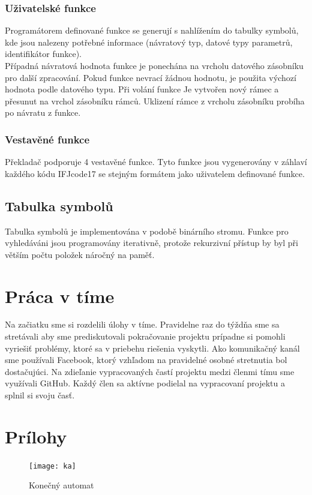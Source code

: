 \documentclass[11pt, a4paper]{article}
\begin{document}
    \subsubsection{Uživatelské funkce}
    Programátorem definované funkce se generují s nahlížením do tabulky symbolů, kde jsou nalezeny potřebné informace (návratový typ, datové typy parametrů, identifikátor funkce).\\
    \indent Případná návratová hodnota funkce je ponechána na vrcholu datového zásobníku pro další zpracování. Pokud funkce nevrací žádnou hodnotu, je použita výchozí hodnota podle datového typu.
    \indent Při volání funkce Je vytvořen nový rámec a přesunut na vrchol zásobníku rámců. Uklizení rámce z vrcholu zásobníku probíha po návratu z funkce.
        \subsubsection{Vestavěné funkce}
    Překladač podporuje 4 vestavěné funkce. Tyto funkce jsou vygenerovány v záhlaví každého kódu IFJcode17 se stejným formátem jako uživatelem definované funkce.
\subsection{Tabulka symbolů}
    Tabulka symbolů je implementována v podobě binárního stromu. Funkce pro vyhledáváni jsou programovány iterativně, protože rekurzivní přístup by byl při větším počtu položek náročný na paměť.
\section {Práca v tíme}
Na začiatku sme si rozdelili úlohy v tíme. Pravidelne raz do týždňa sme sa stretávali aby sme prediskutovali pokračovanie projektu prípadne si pomohli vyriešiť problémy, ktoré sa v priebehu riešenia vyskytli. Ako komunikačný kanál sme používali  Facebook, ktorý vzhľadom na pravidelné osobné stretnutia bol dostačujúci. Na zdieľanie vypracovaných častí projektu medzi členmi tímu sme využívali GitHub.  Každý člen sa aktívne podielal na vypracovaní projektu a splnil si svoju časť.
\newpage
\section{Prílohy} 

 \begin{figure} [h]
	\begin{center}
		\texttt{[image: ka]}	
		\caption{Konečný automat}
		\label{ka}
	\end{center}
		\end{figure}	
\end{document}
